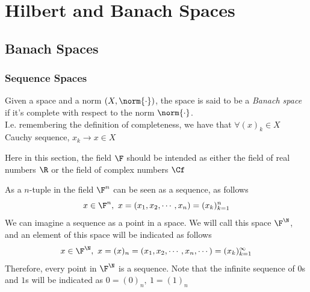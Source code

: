 \documentclass[../mmf.tex]{subfiles}
\begin{document}
\chapter{Hilbert and Banach Spaces}
\section{Banach Spaces}
\subsection{Sequence Spaces}
\begin{dfn}
	Given a space and a norm $(X,\norm{\cdot})$, the space is said to be a \textit{Banach space} if it's complete with respect to the norm $\norm{\cdot}$.\\
	I.e. remembering the definition of completeness, we have that $\forall(x)_k\in X$ Cauchy sequence, $x_k\to x\in X$
\end{dfn}
\begin{ntn}
	Here in this section, the field $\F$ should be intended as either the field of real numbers $\R$ or the field of complex numbers $\Cf$
\end{ntn}
\begin{dfn}
	As a $n$-tuple in the field $\F^n$ can be seen as a sequence, as follows
	\begin{equation*}
		x\in\F^n,\ x=(x_1,x_2,\cdots,x_n)=(x_k)_{k=1}^n
	\end{equation*}
	We can imagine a sequence as a point in a space. We will call this space $\F^\N$, and an element of this space will be indicated as follows
	\begin{equation*}
		x\in\F^\N,\ x=(x)_n=(x_1,x_2,\cdots,x_n,\cdots)=(x_k)_{k=1}^\infty
	\end{equation*}
	Therefore, every point in $\F^\N$ is a sequence. Note that the infinite sequence of $0$s and $1$s will be indicated as $0=(0)_n,\ 1=(1)_n$
\end{dfn}
\end{document}
